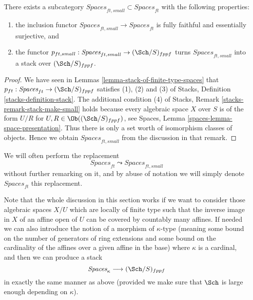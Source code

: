 \begin{lemma}
\label{lemma-stack-ft-spaces}
There exists a subcategory
$\textit{Spaces}_{ft, small} \subset \textit{Spaces}_{ft}$
with the following properties:
\begin{enumerate}
\item the inclusion functor
$\textit{Spaces}_{ft, small} \to \textit{Spaces}_{ft}$ is
fully faithful and essentially surjective, and
\item the functor
$p_{ft, small} : \textit{Spaces}_{ft, small} \to (\Sch/S)_{fppf}$
turns $\textit{Spaces}_{ft, small}$ into a stack over
$(\Sch/S)_{fppf}$.
\end{enumerate}
\end{lemma}

\begin{proof}
We have seen in
Lemmas \ref{lemma-stack-of-finite-type-spaces}
that $p_{ft} : \textit{Spaces}_{ft} \to (\Sch/S)_{fppf}$
satisfies (1), (2) and (3) of
Stacks, Definition \ref{stacks-definition-stack}.
The additional condition (4) of
Stacks, Remark \ref{stacks-remark-stack-make-small}
holds because every algebraic space $X$ over $S$ is of the
form $U/R$ for $U, R \in \Ob((\Sch/S)_{fppf})$, see
Spaces, Lemma \ref{spaces-lemma-space-presentation}.
Thus there is only a set worth of isomorphism classes of objects.
Hence we obtain $\textit{Spaces}_{ft, small}$ from the discussion
in that remark.
\end{proof}

\noindent
We will often perform the replacement
$$
\textit{Spaces}_{ft} \leadsto \textit{Spaces}_{ft, small}
$$
without further remarking on it, and by abuse of notation we will
simply denote $\textit{Spaces}_{ft}$ this replacement.

\begin{remark}
\label{remark-higher-cardinality-spaces}
Note that the whole discussion in this section works
if we want to consider those algebraic spaces $X/U$ which are
locally of finite type such that the inverse image in $X$ of an affine open
of $U$ can be covered by countably many affines.
If needed we can also introduce the notion of a morphism of
$\kappa$-type (meaning some bound on the number of generators of
ring extensions and some bound on the cardinality of the affines over
a given affine in the base) where $\kappa$ is a cardinal, and then
we can produce a stack
$$
\textit{Spaces}_\kappa \longrightarrow (\Sch/S)_{fppf}
$$
in exactly the same manner as above (provided we make sure that
$\Sch$ is large enough depending on $\kappa$).
\end{remark}





